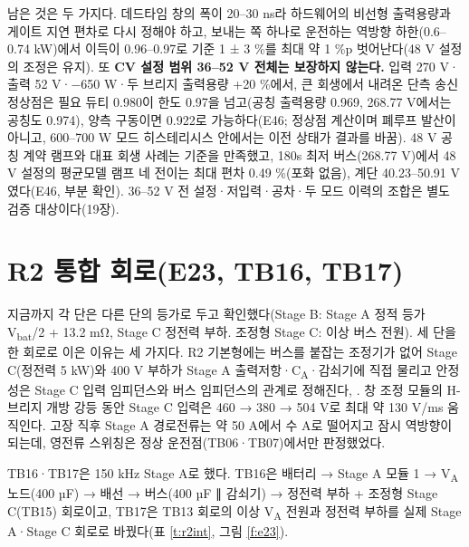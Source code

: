남은 것은 두 가지다. 데드타임 창의 폭이 20–30 ns라 하드웨어의 비선형 출력용량과 게이트 지연 편차로 다시 정해야 하고, 보내는 쪽 하나로 운전하는 역방향 하한(0.6–0.74 kW)에서 이득이 0.96–0.97로 기준 1 ± 3 \%를 최대 약 1 \%p 벗어난다(48 V 설정의 조정은 유지). 또 \textbf{CV 설정 범위 36–52 V 전체는 보장하지 않는다.} 입력 270 V·출력 52 V·−650 W·두 브리지 출력용량 +20 \%에서, 큰 회생에서 내려온 단측 송신 정상점은 필요 듀티 0.980이 한도 0.97을 넘고(공칭 출력용량 0.969, 268.77 V에서는 공칭도 0.974), 양측 구동이면 0.922로 가능하다(E46; 정상점 계산이며 폐루프 발산이 아니고, 600–700 W 모드 히스테리시스 안에서는 이전 상태가 결과를 바꿈). 48 V 공칭 계약 램프와 대표 회생 사례는 기준을 만족했고, 180s 최저 버스(268.77 V)에서 48 V 설정의 평균모델 램프 네 전이는 최대 편차 0.49 \%(포화 없음), 계단 40.23–50.91 V였다(E46, 부분 확인). 36–52 V 전 설정·저입력·공차·두 모드 이력의 조합은 별도 검증 대상이다(19장).

\section{R2 통합 회로(E23, TB16, TB17)}

지금까지 각 단은 다른 단의 등가로 두고 확인했다(Stage B: Stage A 정적 등가 V\textsubscript{bat}/2 + 13.2 mΩ, Stage C 정전력 부하. 조정형 Stage C: 이상 버스 전원). 세 단을 한 회로로 이은 이유는 세 가지다. R2 기본형에는 버스를 붙잡는 조정기가 없어 Stage C(정전력 5 kW)와 400 V 부하가 Stage A 출력저항·C\textsubscript{A}·감쇠기에 직접 물리고 안정성은 Stage C 입력 임피던스와 버스 임피던스의 관계로 정해진다\cite{b20}, \cite{b21}. 창 조정 모듈의 H-브리지 개방 강등 동안 Stage C 입력은 460 → 380 → 504 V로 최대 약 130 V/ms 움직인다. 고장 직후 Stage A 경로전류는 약 50 A에서 수 A로 떨어지고 잠시 역방향이 되는데, 영전류 스위칭은 정상 운전점(TB06·TB07)에서만 판정했었다.

TB16·TB17은 150 kHz Stage A로 했다. TB16은 배터리 → Stage A 모듈 1 → V\textsubscript{A} 노드(400 µF) → 배선 → 버스(400 µF ∥ 감쇠기) → 정전력 부하 + 조정형 Stage C(TB15) 회로이고, TB17은 TB13 회로의 이상 V\textsubscript{A} 전원과 정전력 부하를 실제 Stage A·Stage C 회로로 바꿨다(표 \ref{t:r2int}, 그림 \ref{f:e23}).

